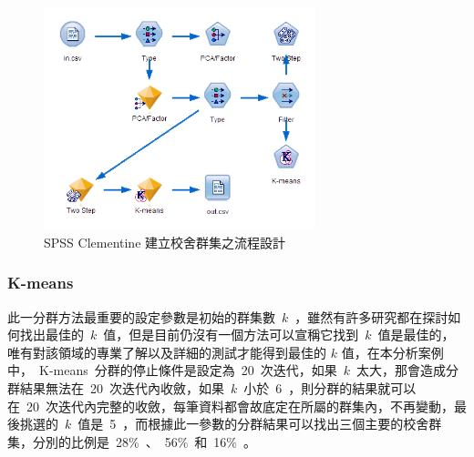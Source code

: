 \begin{figure}[hbtp]
  \begin{center}
    \includegraphics[width=0.7\textwidth]{figures/spss-cluster.png}
    \caption{SPSS Clementine 建立校舍群集之流程設計} 
    \label{fig:spss-cluster}
  \end{center}
\end{figure}


\subsubsection{K-means}

此一分群方法最重要的設定參數是初始的群集數~$k$~，雖然有許多研究都在探討如何找出最佳的~$k$~值，但是目前仍沒有一個方法可以宣稱它找到~$k$~值是最佳的，唯有對該領域的專業了解以及詳細的測試才能得到最佳的 $k$ 值，在本分析案例中，~K-means~分群的停止條件是設定為~20~次迭代，如果~$k$~太大，那會造成分群結果無法在~20~次迭代內收斂，如果~$k$~小於~6~，則分群的結果就可以在~20~次迭代內完整的收斂，每筆資料都會故底定在所屬的群集內，不再變動，最後挑選的~$k$~值是~5~，而根據此一參數的分群結果可以找出三個主要的校舍群集，分別的比例是~28\%~、~56\%~和~16\%~。



